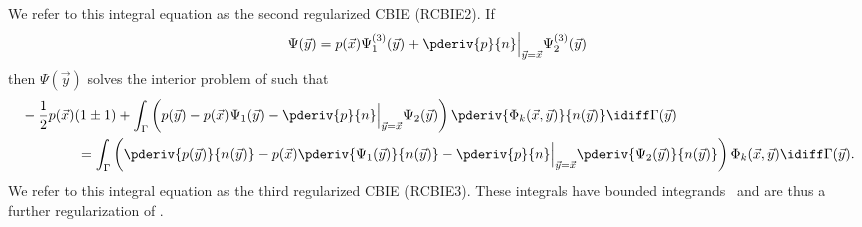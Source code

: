 We refer to this integral equation as the second regularized CBIE (RCBIE2). If
\begin{equation*}
	\Psi(\vec{y}) = p(\vec{x})\Psi_1^{(3)}(\vec{y}) + \pderiv{p}{n}\Big\vert_{\vec{y}=\vec{x}}\Psi_2^{(3)}(\vec{y})
\end{equation*}
then $\Psi(\vec{y})$ solves the interior problem of  such that
\begin{equation}\label{Eq3:RCBIE3}
\begin{aligned}
	&-\frac{1}{2}p(\vec{x})(1\pm 1) + \int_\Gamma \left(p(\vec{y}) - p(\vec{x})\Psi_1(\vec{y}) - \pderiv{p}{n}\Big\vert_{\vec{y}=\vec{x}}\Psi_2(\vec{y})\right)\pderiv{\Phi_k(\vec{x},\vec{y})}{n(\vec{y})}  \idiff\Gamma(\vec{y}) \\
	&{\hskip4em\relax}= \int_\Gamma \left(\pderiv{p(\vec{y})}{n(\vec{y})} - p(\vec{x})\pderiv{\Psi_1(\vec{y})}{n(\vec{y})} - \pderiv{p}{n}\Big\vert_{\vec{y}=\vec{x}}\pderiv{\Psi_2(\vec{y})}{n(\vec{y})}\right)\Phi_k(\vec{x},\vec{y}) \idiff\Gamma(\vec{y}).
\end{aligned}
\end{equation}
We refer to this integral equation as the third regularized CBIE (RCBIE3). These integrals have bounded integrands~\cite{Klaseboer2012nsb} and are thus a further regularization of .


